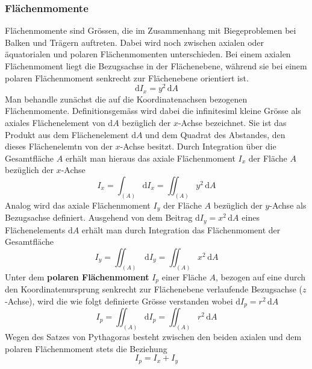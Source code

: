 \subsubsection{Flächenmomente}
Flächenmomente sind Grössen, die im Zusammenhang mit Biegeproblemen bei Balken und Trägern auftreten. Dabei wird noch zwischen axialen oder äquatorialen und polaren Flächenmomenten unterschieden. Bei einem axialen Flächenmoment liegt die Bezugsachse in der Flächenebene, während sie bei einem polaren Flächenmoment senkrecht zur Flächenebene orientiert ist.
\begin{equation} 
\boxed{\text{d}I_x=y^2\,\text{d}A}
\end{equation}
Man behandle zunächst die auf die Koordinatenachsen bezogenen Flächenmomente. Definitionsgemäss wird dabei die infinitesiml kleine Grösse als axiales Flächenelement von $\text{d}A$ bezüglich der $x$-Achse bezeichnet. Sie ist das Produkt aus dem Flächenelement $\text{d}A$ und dem Quadrat des Abstandes, den dieses Flächenelemtn von der $x$-Achse besitzt.
\newline\newline
Durch Integration über die Gesamtfläche $A$ erhält man hieraus das axiale Flächenmoment $I_x$ der Fläche $A$ bezüglich der $x$-Achse
\begin{equation}
\boxed{I_x=\displaystyle \int_{\left(A\right)}\text{d}I_x=\displaystyle \iint_{\left(A\right)}y^2\,\text{d}A}
\end{equation}
Analog wird das axiale Flächenmoment $I_y$ der Fläche $A$ bezüglich der $y$-Achse als Bezugsachse definiert. Ausgehend von dem Beitrag $\text{d}I_y=x^2\,\text{d}A$ eines Flächenelements $\text{d}A$ erhält man durch Integration das Flächenmoment der Gesamtfläche
\begin{equation}
\boxed{I_y=\displaystyle \iint_{\left(A\right)}\,\text{d}I_y=\displaystyle \iint_{\left(A\right)}x^2\,\text{d}A}
\end{equation}
Unter dem \textbf{polaren Flächenmoment} $I_p$ einer Fläche $A$, bezogen auf eine durch den Koordinatenursprung senkrecht zur Flächenebene verlaufende Bezugsachse ($z$-Achse), wird die wie folgt definierte Grösse verstanden wobei $\text{d}I_p=r^2\,\text{d}A$
\begin{equation}
\boxed{I_p=\displaystyle \iint_{\left(A\right)}\text{d}I_p=\displaystyle \iint_{\left(A\right)}r^2\,\text{d}A}
\end{equation}
Wegen des Satzes von Pythagoras besteht zwischen den beiden axialen und dem polaren Flächenmoment stets die Beziehung
\begin{equation}
\boxed{I_p=I_x+I_y}
\end{equation}
